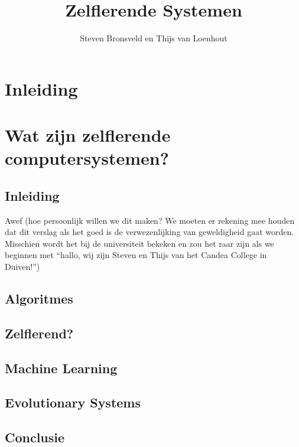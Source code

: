 \documentclass[a4paper]{article}
\title{Zelflerende Systemen}
\author{Steven Bronsveld en Thijs van Loenhout}
\begin{document}
\maketitle

\renewcommand{\contentsname}{Inhoud}

\tableofcontents

\section{Inleiding}

\section{Wat zijn zelflerende computersystemen?}



\subsection{Inleiding}
Awef (hoe persoonlijk willen we dit maken? We moeten er rekening mee houden dat dit verslag als het goed is de verwezenlijking van geweldigheid gaat worden. Misschien wordt het bij de universiteit bekeken en zou het raar zijn als we beginnen met “hallo, wij zijn Steven en Thijs van het Candea College in Duiven!”)


\subsection{Algoritmes}

\subsection{Zelflerend?}

\subsection{Machine Learning}

\subsection{Evolutionary Systems}

\subsection{Conclusie}
\end{document}
